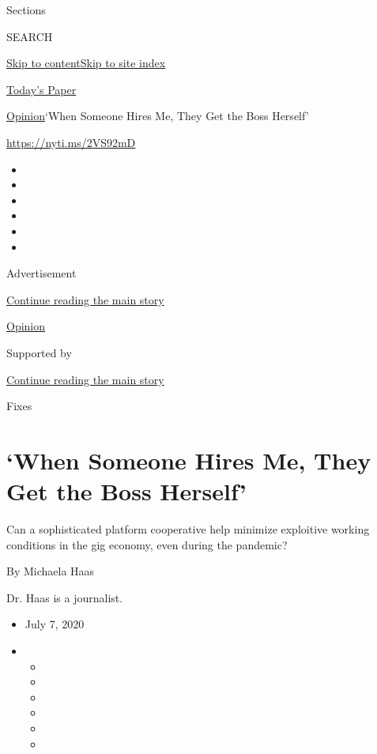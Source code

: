 Sections

SEARCH

\protect\hyperlink{site-content}{Skip to
content}\protect\hyperlink{site-index}{Skip to site index}

\href{https://myaccount.nytimes.com/auth/login?response_type=cookie\&client_id=vi}{}

\href{https://www.nytimes.com/section/todayspaper}{Today's Paper}

\href{/section/opinion}{Opinion}\textbar{}`When Someone Hires Me, They
Get the Boss Herself'

\href{https://nyti.ms/2VS92mD}{https://nyti.ms/2VS92mD}

\begin{itemize}
\item
\item
\item
\item
\item
\item
\end{itemize}

Advertisement

\protect\hyperlink{after-top}{Continue reading the main story}

\href{/section/opinion}{Opinion}

Supported by

\protect\hyperlink{after-sponsor}{Continue reading the main story}

Fixes

\hypertarget{when-someone-hires-me-they-get-the-boss-herself}{%
\section{`When Someone Hires Me, They Get the Boss
Herself'}\label{when-someone-hires-me-they-get-the-boss-herself}}

Can a sophisticated platform cooperative help minimize exploitive
working conditions in the gig economy, even during the pandemic?

By Michaela Haas

Dr. Haas is a journalist.

\begin{itemize}
\item
  July 7, 2020
\item
  \begin{itemize}
  \item
  \item
  \item
  \item
  \item
  \item
  \end{itemize}
\end{itemize}

